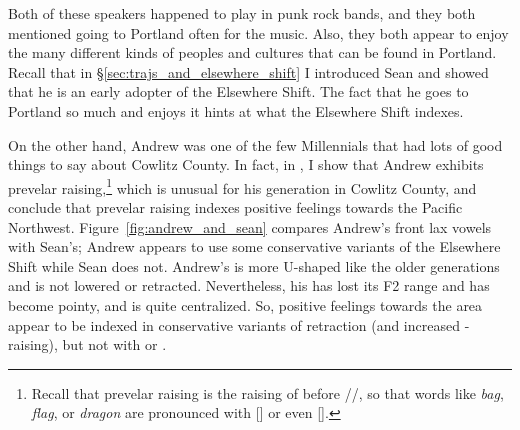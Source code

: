 Both of these speakers happened to play in punk rock bands, and they both mentioned going to Portland often for the music. Also, they both appear to enjoy the many different kinds of peoples and cultures that can be found in Portland. Recall that in \S\ref{sec:trajs_and_elsewhere_shift} I introduced Sean and showed that he is an early adopter of the Elsewhere Shift. The fact that he goes to Portland so much and enjoys it hints at what the Elsewhere Shift indexes.

On the other hand, Andrew was one of the few Millennials that had lots of good things to say about Cowlitz County. In fact, in \citet{stanley_2018_pwpl}, I show that Andrew exhibits prevelar raising,\footnote{Recall that prevelar raising is the raising of \trap before //, so that words like \textit{bag}, \textit{flag}, or \textit{dragon} are pronounced with [] or even [].} which is unusual for his generation in Cowlitz County, and conclude that prevelar raising indexes positive feelings towards the Pacific Northwest. Figure~\ref{fig:andrew_and_sean} compares Andrew's front lax vowels with Sean's; Andrew appears to use some conservative variants of the Elsewhere Shift while Sean does not. Andrew's \bat is more U-shaped like the older generations and is not lowered or retracted. Nevertheless, his \bet has lost its F2 range and has become pointy, and \bit is quite centralized. So, positive feelings towards the area appear to be indexed in conservative variants of \bat retraction (and increased \bag-raising), but not with \bet or \bit.

